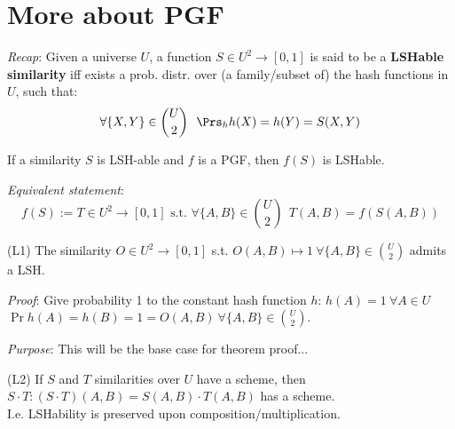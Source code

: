 \section{More about PGF}  %
	
	\textit{Recap}: Given a universe $U$, a function $S \in U^2 \to [0, 1]$ is said to be a \textbf{LSHable similarity} iff exists a prob. distr. over (a family/subset of) the hash functions in $U$, such that: 
	\begin{equation}
	\forall \{X, Y\} \in \binom{U}{2}\ \ \Prs_h{h(X)=h(Y)} = S(X, Y)
	\end{equation}
	
	\thm \label{t:pgf_1} If a similarity $S$ is LSH-able and $f$ is a PGF, then $f(S)$ is LSHable.
	
	\textit{Equivalent statement}:
	\begin{equation}
	f(S) := T \in U^2 \to [0, 1] \text{ s.t. } \forall \{A, B\} \in \binom{U}{2}\ \ T(A, B) = f(S(A, B))
	\end{equation}
	
	
	\lem \label{l:pgf_1} (L1) The similarity $O \in U^2 \to [0, 1]$ s.t. $O(A, B) \mapsto 1 \ \forall \{A, B\} \in \binom{U}{2}$ admits a LSH.
	
	\textit{Proof}: Give probability 1 to the constant hash function $h$: $h(A)=1 \ \forall A\in U$\\
	$\Pr{h(A)=h(B)}=1=O(A,B) \ \forall \{A, B\} \in \binom{U}{2}$.
	
	
	\textit{Purpose}: This will be the base case for theorem proof...
	
	\lem \label{l:pgf_2} (L2) If $S$ and $T$ similarities over $U$ have a scheme, then $S \cdot T : (S \cdot T)(A, B) = S(A, B)\cdot T(A, B)$ has a scheme. \\
	I.e. LSHability is preserved upon composition/multiplication.
	

